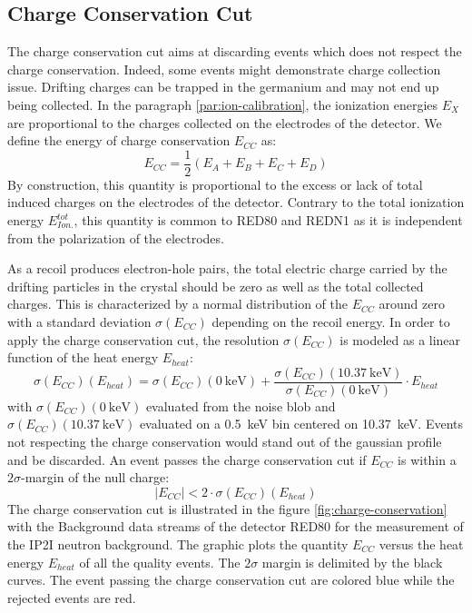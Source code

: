 \subsection{Charge Conservation Cut}
\label{par:charge-conservation-cut}

The charge conservation cut aims at discarding events which does not respect the charge conservation. Indeed, some events might demonstrate charge collection issue. Drifting charges can be trapped in the germanium and may not end up being collected. In the paragraph \ref{par:ion-calibration}, the ionization energies $E_X$ are proportional to the charges collected on the electrodes of the detector. We define the energy of charge conservation $E_{CC}$ as:
\begin{equation}
E_{CC} = \frac{1}{2} \left( E_A + E_B + E_C + E_D \right)
\end{equation}
By construction, this quantity is proportional to the excess or lack of total induced charges on the electrodes of the detector. Contrary to the total ionization energy $E_{Ion.}^{tot}$, this quantity is common to RED80 and REDN1  as it is independent from the polarization of the electrodes.

As a recoil produces electron-hole pairs, the total electric charge carried by the drifting particles in the crystal should be zero as well as the total collected charges. This is characterized by a normal distribution of the $E_{CC}$ around zero with a standard deviation $\sigma(E_{CC})$ depending on the recoil energy. In order to apply the charge conservation cut, the resolution $\sigma(E_{CC})$ is modeled as a linear function of the heat energy $E_{heat}$:
\begin{equation}
\sigma(E_{CC})(E_{heat})
=
\sigma(E_{CC})(\SI{0}{\kilo\eV}) + \frac{\sigma(E_{CC})(\SI{10.37}{\kilo\eV})}{\sigma(E_{CC})(\SI{0}{\kilo\eV})} \cdot E_{heat}
\end{equation}
with $\sigma(E_{CC})(\SI{0}{\kilo\eV})$ evaluated from the noise blob and $\sigma(E_{CC})(\SI{10.37}{\kilo\eV})$ evaluated on a \SI{0.5}{\kilo\eV} bin centered on \SI{10.37}{\kilo\eV}.
Events not respecting the charge conservation would stand out of the gaussian profile and be discarded. An event passes the charge conservation cut if $E_{CC}$ is within a $2\sigma$-margin of the null charge:
\begin{equation}
|E_{CC}| < 2 \cdot \sigma(E_{CC})(E_{heat})
\end{equation}
The charge conservation cut is illustrated in the figure \ref{fig:charge-conservation} with the Background data streams of the detector RED80 for the measurement of the IP2I neutron background. The graphic plots the quantity $E_{CC}$ versus the heat energy $E_{heat}$ of all the quality events. The $2\sigma$ margin is delimited by the black curves. The event passing the charge conservation cut are colored blue while the rejected events are red.

